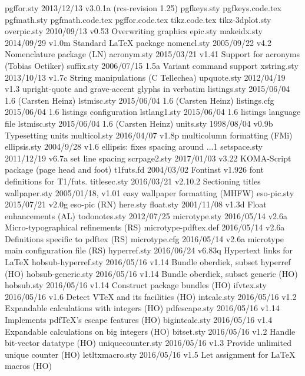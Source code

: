   pgffor.sty    2013/12/13 v3.0.1a (rcs-revision 1.25)
 pgfkeys.sty    
 pgfkeys.code.tex
 pgfmath.sty    
 pgfmath.code.tex
  pgffor.code.tex
    tikz.code.tex
tikz-3dplot.sty    
 overpic.sty    2010/09/13 v0.53  Overwriting graphics
    epic.sty    
 makeidx.sty    2014/09/29 v1.0m Standard LaTeX package
 nomencl.sty    2005/09/22 v4.2 Nomenclature package (LN)
 acronym.sty    2015/03/21 v1.41 Support for acronyms (Tobias Oetiker)
  suffix.sty    2006/07/15 1.5a Variant command support
 xstring.sty    2013/10/13  v1.7c  String manipulations (C Tellechea)
 upquote.sty    2012/04/19 v1.3 upright-quote and grave-accent glyphs in verbatim
listings.sty    2015/06/04 1.6 (Carsten Heinz)
 lstmisc.sty    2015/06/04 1.6 (Carsten Heinz)
listings.cfg    2015/06/04 1.6 listings configuration
lstlang1.sty    2015/06/04 1.6 listings language file
 lstmisc.sty    2015/06/04 1.6 (Carsten Heinz)
   units.sty    1998/08/04 v0.9b Typesetting units
multicol.sty    2016/04/07 v1.8p multicolumn formatting (FMi)
ellipsis.sty    2004/9/28 v1.6 ellipsis: fixes spacing around \global\let \T1\textellipsis .\kern {}\font .\kern {}\font .\kern {}\font \T1\textellipsis 
setspace.sty    2011/12/19 v6.7a set line spacing
scrpage2.sty    2017/01/03 v3.22 KOMA-Script package (page head and foot)
  t1futs.fd    2004/03/02 Fontinst v1.926 font definitions for T1/futs.
titlesec.sty    2016/03/21 v2.10.2 Sectioning titles
wallpaper.sty    2005/01/18, v1.01 easy wallpaper formatting (MHFW)
 eso-pic.sty    2015/07/21 v2.0g eso-pic (RN)
    here.sty    
   float.sty    2001/11/08 v1.3d Float enhancements (AL)
todonotes.sty    2012/07/25
microtype.sty    2016/05/14 v2.6a Micro-typographical refinements (RS)
microtype-pdftex.def    2016/05/14 v2.6a Definitions specific to pdftex (RS)
microtype.cfg    2016/05/14 v2.6a microtype main configuration file (RS)
hyperref.sty    2016/06/24 v6.83q Hypertext links for LaTeX
hobsub-hyperref.sty    2016/05/16 v1.14 Bundle oberdiek, subset hyperref (HO)
hobsub-generic.sty    2016/05/16 v1.14 Bundle oberdiek, subset generic (HO)
  hobsub.sty    2016/05/16 v1.14 Construct package bundles (HO)
  ifvtex.sty    2016/05/16 v1.6 Detect VTeX and its facilities (HO)
 intcalc.sty    2016/05/16 v1.2 Expandable calculations with integers (HO)
pdfescape.sty    2016/05/16 v1.14 Implements pdfTeX's escape features (HO)
bigintcalc.sty    2016/05/16 v1.4 Expandable calculations on big integers (HO)
  bitset.sty    2016/05/16 v1.2 Handle bit-vector datatype (HO)
uniquecounter.sty    2016/05/16 v1.3 Provide unlimited unique counter (HO)
letltxmacro.sty    2016/05/16 v1.5 Let assignment for LaTeX macros (HO)
